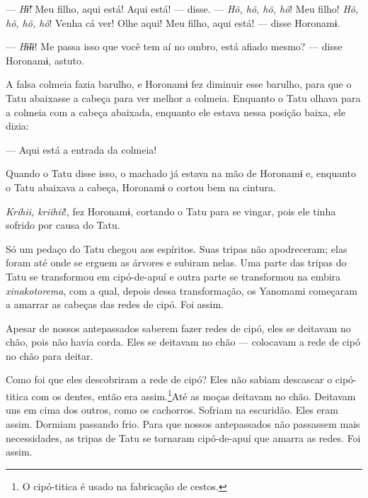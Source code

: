 --- \textit{Hɨ̃}! Meu filho, aqui está! Aqui está! --- disse. --- \textit{Hõ, hõ, hõ,
hõ}! Meu filho! \textit{Hõ, hõ, hõ, hõ}! Venha cá ver! Olhe aqui! Meu filho, aqui
está! --- disse Horonamɨ. 


--- \textit{Hɨ̃ɨɨ}! Me passa isso que você tem aí no ombro, está afiado
mesmo? --- disse Horonamɨ, astuto. 

A falsa colmeia fazia barulho, e Horonamɨ fez diminuir esse barulho,
para que o Tatu abaixasse a cabeça para ver melhor a colmeia. Enquanto o
Tatu olhava para a colmeia com a cabeça abaixada, enquanto ele estava
nessa posição baixa, ele dizia:

--- Aqui está a entrada da colmeia! 

Quando o Tatu disse isso, o machado já estava na mão de Horonamɨ e,
enquanto o Tatu abaixava a cabeça, Horonamɨ o cortou bem na cintura. 

\textit{Krihii, kriihii}!, fez Horonamɨ, cortando o Tatu para se vingar, pois
ele tinha sofrido por causa do Tatu. 



Só um pedaço do Tatu chegou aos espíritos. Suas tripas não apodreceram;
elas foram até onde se erguem as árvores e subiram nelas. Uma parte das
tripas do Tatu se transformou em cipó-de-apuí e outra parte se
transformou na embira \textit{xinakotorema}, com a qual, depois dessa
transformação, os Yanomami começaram a amarrar as cabeças das redes de
cipó. Foi assim.

Apesar de nossos antepassados saberem fazer redes de cipó, eles se
deitavam no chão, pois não havia corda. Eles se deitavam no chão ---
colocavam a rede de cipó no chão para deitar. 

Como foi que eles descobriram a rede de cipó? Eles não sabiam descascar
o cipó-titica com os dentes, então era assim.\footnote{O cipó-titica é usado na fabricação de cestos.}Até as
moças deitavam no chão. Deitavam uns em cima dos outros, como os
cachorros. Sofriam na escuridão. Eles eram assim. Dormiam passando frio.
Para que nossos antepassados não passassem mais necessidades, as tripas
de Tatu se tornaram cipó-de-apuí que amarra as redes. Foi assim. 

